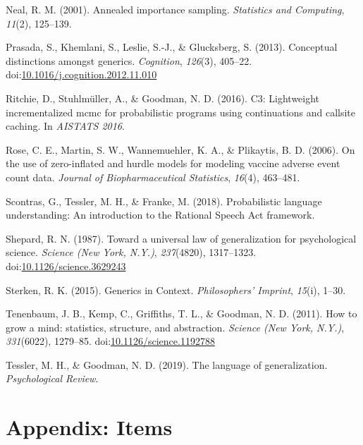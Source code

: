 \documentclass[floatsintext,doc]{apa6}
\begin{document}
\leavevmode\hypertarget{ref-neal2001annealed}{}%
Neal, R. M. (2001). Annealed importance sampling. \emph{Statistics and Computing}, \emph{11}(2), 125--139.

\leavevmode\hypertarget{ref-Prasada2013}{}%
Prasada, S., Khemlani, S., Leslie, S.-J., \& Glucksberg, S. (2013). Conceptual distinctions amongst generics. \emph{Cognition}, \emph{126}(3), 405--22. doi:\href{https://doi.org/10.1016/j.cognition.2012.11.010}{10.1016/j.cognition.2012.11.010}

\leavevmode\hypertarget{ref-Ritchie2016}{}%
Ritchie, D., Stuhlmüller, A., \& Goodman, N. D. (2016). C3: Lightweight incrementalized mcmc for probabilistic programs using continuations and callsite caching. In \emph{AISTATS 2016}.

\leavevmode\hypertarget{ref-hurdleModels}{}%
Rose, C. E., Martin, S. W., Wannemuehler, K. A., \& Plikaytis, B. D. (2006). On the use of zero-inflated and hurdle models for modeling vaccine adverse event count data. \emph{Journal of Biopharmaceutical Statistics}, \emph{16}(4), 463--481.

\leavevmode\hypertarget{ref-problang}{}%
Scontras, G., Tessler, M. H., \& Franke, M. (2018). Probabilistic language understanding: An introduction to the Rational Speech Act framework.

\leavevmode\hypertarget{ref-Shepard1987}{}%
Shepard, R. N. (1987). Toward a universal law of generalization for psychological science. \emph{Science (New York, N.Y.)}, \emph{237}(4820), 1317--1323. doi:\href{https://doi.org/10.1126/science.3629243}{10.1126/science.3629243}

\leavevmode\hypertarget{ref-Sterken2015}{}%
Sterken, R. K. (2015). Generics in Context. \emph{Philosophers' Imprint}, \emph{15}(i), 1--30.

\leavevmode\hypertarget{ref-Tenenbaum2011}{}%
Tenenbaum, J. B., Kemp, C., Griffiths, T. L., \& Goodman, N. D. (2011). How to grow a mind: statistics, structure, and abstraction. \emph{Science (New York, N.Y.)}, \emph{331}(6022), 1279--85. doi:\href{https://doi.org/10.1126/science.1192788}{10.1126/science.1192788}

\leavevmode\hypertarget{ref-Tessler2019psychrev}{}%
Tessler, M. H., \& Goodman, N. D. (2019). The language of generalization. \emph{Psychological Review}.

\newpage

\hypertarget{appendix-items}{%
\section{Appendix: Items}\label{appendix-items}}
\end{document}
